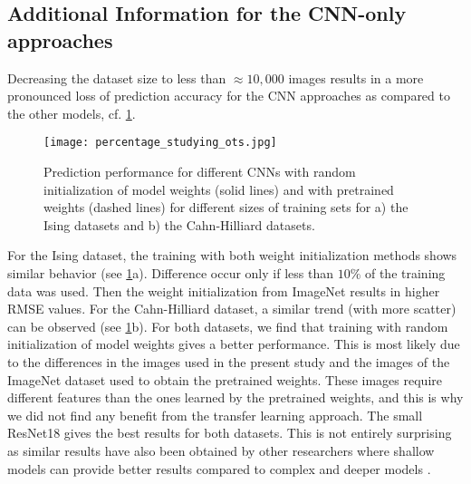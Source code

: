 \documentclass[11pt, authoryear]{elsarticle}
\begin{document}
\begin{appendix}
		\subsection{Additional Information for the CNN-only approaches}
		Decreasing the dataset size to less than $\approx 10,000$ images 
		results in a more pronounced loss of prediction accuracy for the CNN 
		approaches as compared to the other models, cf.
		\cref{fig:percentage_studying_ots}. 
		\begin{figure}
			\centering
			\texttt{[image: percentage\_studying\_ots.jpg]}
			\caption{
				Prediction performance for different CNNs with random initialization 
				of model weights (solid lines) and with pretrained weights (dashed lines) 
				for different sizes of training sets for a) the Ising datasets and  b) the 
				Cahn-Hilliard datasets.
			}
			\label{fig:percentage_studying_ots}
		\end{figure}
		For the Ising dataset, the training with both weight initialization methods
		shows similar behavior (see \cref{fig:percentage_studying_ots}a). Difference
		occur only if less than $10\%$ of the training data was used. Then the 
		weight initialization from ImageNet results in higher RMSE values. 
		For the  Cahn-Hilliard dataset, a similar trend (with more scatter) 
		can be observed (see \cref{fig:percentage_studying_ots}b).
		For both datasets, we find that training with random initialization of model weights gives a better performance. This is most likely due to the 
		differences in the images used in the present study and the images of the 
		ImageNet dataset used to obtain the pretrained weights. These images require
		different features than the ones learned by the pretrained weights, and this 
		is why we did not find any benefit from the transfer learning approach. 
		The small ResNet18 gives the best results for both datasets. This is not
		entirely surprising as similar results have also been obtained by other researchers where shallow models can provide better results compared to complex and deeper models \citep{bressem2020comparing}. 
		

\end{appendix}
\end{document}
